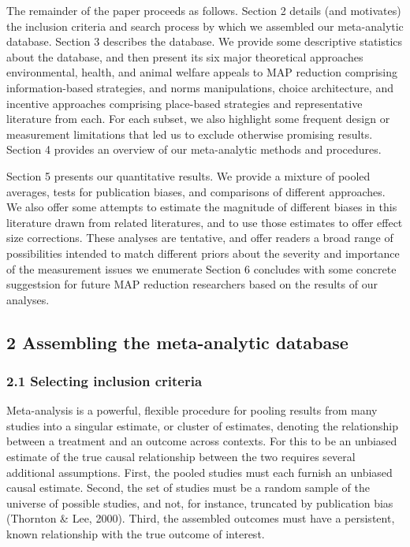 \documentclass[
  man]{apa6}
\begin{document}
The remainder of the paper proceeds as follows. Section 2 details (and motivates) the inclusion criteria and search process by which we assembled our meta-analytic database. Section 3 describes the database. We provide some descriptive statistics about the database, and then present its six major theoretical approaches \textemdash environmental, health, and animal welfare appeals to MAP reduction comprising information-based strategies, and norms manipulations, choice architecture, and incentive approaches comprising place-based strategies \textemdash and representative literature from each. For each subset, we also highlight some frequent design or measurement limitations that led us to exclude otherwise promising results. Section 4 provides an overview of our meta-analytic methods and procedures.

Section 5 presents our quantitative results. We provide a mixture of pooled averages, tests for publication biases, and comparisons of different approaches. We also offer some attempts to estimate the magnitude of different biases in this literature drawn from related literatures, and to use those estimates to offer effect size corrections. These analyses are tentative, and offer readers a broad range of possibilities intended to match different priors about the severity and importance of the measurement issues we enumerate Section 6 concludes with some concrete suggestsion for future MAP reduction researchers based on the results of our analyses.

\subsection{2 Assembling the meta-analytic database}\label{assembling-the-meta-analytic-database}

\subsubsection{2.1 Selecting inclusion criteria}\label{selecting-inclusion-criteria}

Meta-analysis is a powerful, flexible procedure for pooling results from many studies into a singular estimate, or cluster of estimates, denoting the relationship between a treatment and an outcome across contexts. For this to be an unbiased estimate of the true causal relationship between the two requires several additional assumptions. First, the pooled studies must each furnish an unbiased causal estimate. Second, the set of studies must be a random sample of the universe of possible studies, and not, for instance, truncated by publication bias (Thornton \& Lee, 2000). Third, the assembled outcomes must have a persistent, known relationship with the true outcome of interest.
\end{document}
